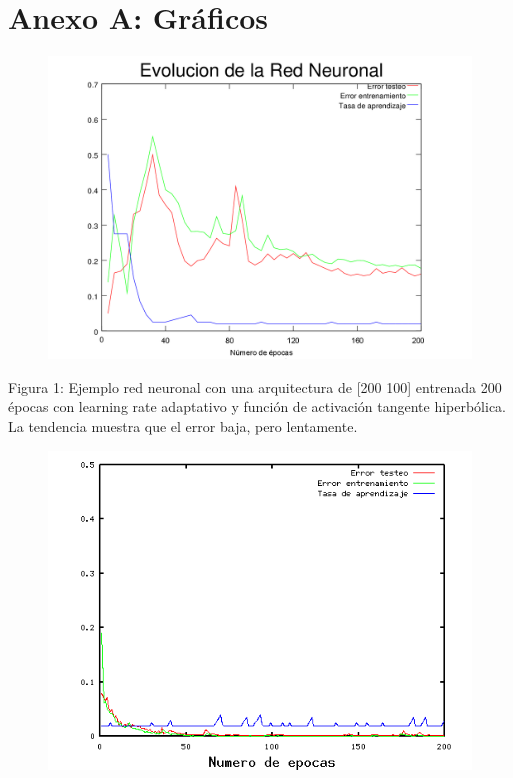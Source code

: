 \documentclass[%
    final,
    reprint,
    notitlepage,
    narroweqnarray,
    inline,
    twoside,
    invited
    ]{ieee}
\begin{document}


\clearpage
\onecolumn

\section*{Anexo A: Gráficos}

\begin{figure}[H]
\begin{center}
\includegraphics[scale=0.70]{./images/6.png}
\label{modelado}
\end{center}
\end{figure}

\begin{center}
\par Figura 1: Ejemplo red neuronal con una arquitectura de [200 100] entrenada 200 épocas con learning rate adaptativo y función de activación tangente hiperbólica.  
La tendencia muestra que el error baja, pero lentamente.
\end{center}

\begin{figure}[H]
\begin{center}
\includegraphics[scale=0.70]{./images/nice.png}
\label{modelado}
\end{center}
\end{figure}
\end{document}
